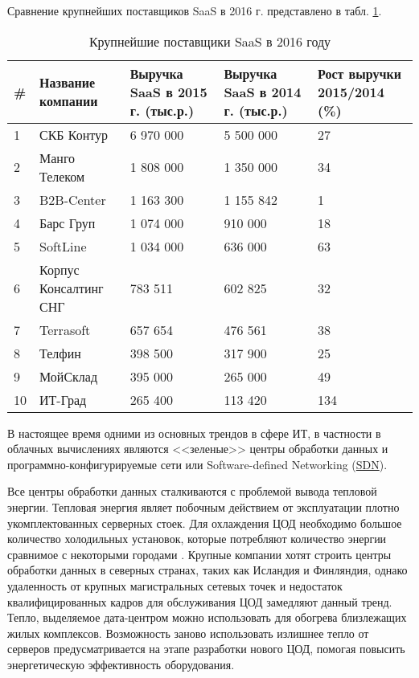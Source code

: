 Сравнение крупнейших поставщиков SaaS в 2016 г. \cite{cnews} представлено в табл. \ref{saas-table}.
\begin{table}[H]
  \caption{Крупнейшие поставщики SaaS в 2016 году}\label{saas-table}
  \begin{tabular}{|p{0.5cm}|p{3.5cm}|p{3.5cm}|p{3.5cm}|p{3.5cm}|}
  \hline \# & Название компании & Выручка SaaS в 2015 г. (тыс.р.) & Выручка SaaS в 2014 г. (тыс.р.) & Рост выручки 2015/2014 (\%) \\
  \hline 1 & СКБ Контур & 6 970 000 & 5 500 000 & 27 \\
  \hline 2 & Манго Телеком & 1 808 000 & 1 350 000 & 34 \\
  \hline 3 & B2B-Center & 1 163 300 & 1 155 842 & 1 \\
  \hline 4 & Барс Груп & 1 074 000 & 910 000 & 18 \\
  \hline 5 & SoftLine & 1 034 000 & 636 000 & 63 \\
  \hline 6 & Корпус Консалтинг СНГ & 783 511 & 602 825 & 32 \\
  \hline 7 & Terrasoft & 657 654 & 476 561 & 38 \\
  \hline 8 & Телфин & 398 500 & 317 900 & 25 \\
  \hline 9 & МойСклад & 395 000 & 265 000 & 49 \\
  \hline 10 & ИТ-Град & 265 400 & 113 420 & 134 \\
  \hline
  \end{tabular}
\end{table}

В настоящее время одними из основных трендов в сфере ИТ, в частности в облачных вычислениях являются <<зеленые>> центры обработки данных и программно-конфигурируемые сети или Software-defined Networking (\hyperlink{sdn}{SDN}).

Все центры обработки данных сталкиваются с проблемой вывода тепловой энергии.
Тепловая энергия являет побочным действием от эксплуатации плотно укомплектованных серверных стоек.
Для охлаждения ЦОД необходимо большое количество холодильных установок, которые потребляют количество энергии сравнимое с некоторыми городами \cite{cnewsdc}.
Крупные компании хотят строить центры обработки данных в северных странах, таких как Исландия и Финляндия, однако удаленность от крупных магистральных сетевых точек и недостаток квалифицированных кадров для обслуживания ЦОД замедляют данный тренд.
Тепло, выделяемое дата-центром можно использовать для обогрева близлежащих жилых комплексов.
Возможность заново использовать излишнее тепло от серверов предусматривается на этапе разработки нового ЦОД, помогая повысить энергетическую эффективность оборудования.

